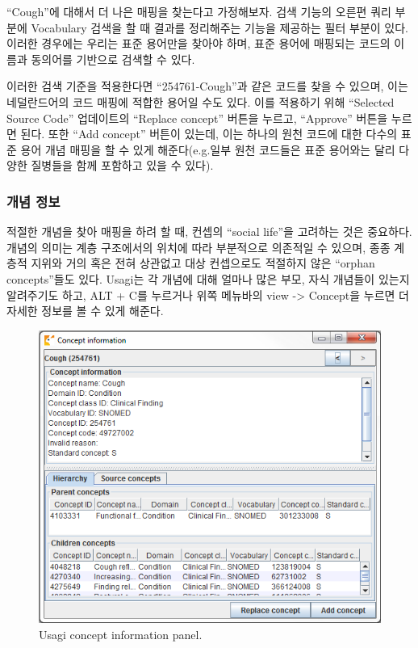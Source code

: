 \documentclass[11pt]{book}
\theoremstyle{definition}
\theoremstyle{definition}
\theoremstyle{definition}
\theoremstyle{remark}
\begin{document}
``Cough''에 대해서 더 나은 매핑을 찾는다고 가정해보자. 검색 기능의
오른편 쿼리 부분에 Vocabulary 검색을 할 때 결과를 정리해주는 기능을
제공하는 필터 부분이 있다. 이러한 경우에는 우리는 표준 용어만을 찾아야
하며, 표준 용어에 매핑되는 코드의 이름과 동의어를 기반으로 검색할 수
있다.

이러한 검색 기준을 적용한다면 ``254761-Cough''과 같은 코드를 찾을 수
있으며, 이는 네덜란드어의 코드 매핑에 적합한 용어일 수도 있다. 이를
적용하기 위해 ``Selected Source Code'' 업데이트의 ``Replace concept''
버튼을 누르고, ``Approve'' 버튼을 누르면 된다. 또한 ``Add concept''
버튼이 있는데, 이는 하나의 원천 코드에 대한 다수의 표준 용어 개념 매핑을
할 수 있게 해준다(e.g.일부 원천 코드들은 표준 용어와는 달리 다양한
질병들을 함께 포함하고 있을 수 있다).

\subsubsection*{개념 정보}\label{-}

적절한 개념을 찾아 매핑을 하려 할 때, 컨셉의 ``social life''을 고려하는
것은 중요하다. 개념의 의미는 계층 구조에서의 위치에 따라 부분적으로
의존적일 수 있으며, 종종 계층적 지위와 거의 혹은 전혀 상관없고 대상
컨셉으로도 적절하지 않은 ``orphan concepts''들도 있다. Usagi는 각 개념에
대해 얼마나 많은 부모, 자식 개념들이 있는지 알려주기도 하고, ALT + C를
누르거나 위쪽 메뉴바의 view -\textgreater{} Concept을 누르면 더 자세한
정보를 볼 수 있게 해준다.

\begin{figure}

{\centering \includegraphics[width=1\linewidth]{images/ExtractTransformLoad/usagiConceptInfo} 

}

\caption{Usagi concept information panel.}\label{fig:usagiConceptInfo}
\end{figure}
\end{document}
